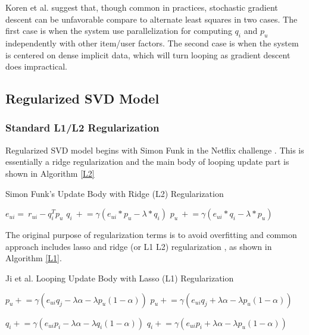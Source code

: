 \documentclass[letter paper, 11pt]{article}
\begin{document}
	Koren et al. \cite{MFinRS} suggest that, though common in practices, stochastic gradient descent can be unfavorable compare to alternate least squares in two cases. The first case is when the system use parallelization for computing $q_i$ and $p_u$ independently with other item/user factors. The second case is when the system is centered on dense implicit data, which will turn looping as gradient descent does impractical.

	

	\subsection{Regularized SVD Model}

	\subsubsection{Standard L1/L2 Regularization}

	\newcommand\myeq{\mathrel{\overset{\makebox[0pt]{\mbox{\normalfont\tiny\sffamily def}}}{=}}}
	\newcommand{\pluseq}{\mathrel{+}=}
	\newcommand{\minuseq}{\mathrel{-}=}
	Regularized SVD model begins with Simon Funk in the Netflix challenge \cite{MFinRS}. This is essentially a ridge regularization and the main body of looping update part is shown in Algorithm \ref{L2}
	\begin{algorithm}
		\caption{Simon Funk's Update Body with Ridge (L2) Regularization\cite{MFinRS}}
		\label{L2}
		\begin{algorithmic}
			\STATE $e_{ui} = \ r_{ui} - q_i^T p_u$
			\STATE $q_i\ \pluseq \gamma (e_{ui} * p_u - \lambda * q_i)$
			\STATE $p_u\ \pluseq \gamma (e_{ui} * q_i - \lambda * p_u)$
		\end{algorithmic}
	\end{algorithm}

	The original purpose of regularization terms is to avoid overfitting and common approach includes lasso and ridge (or L1 L2) regularization \cite{RSVD-News}, as shown in Algorithm \ref{L1}.
	
	\floatname{algorithm}{Algorithm}
	\begin{algorithm}
		\caption{Ji et al. Looping Update Body with Lasso (L1) Regularization\cite{RSVD-News}}
		\label{alg:L1}
		\begin{algorithmic}
			\IF{$p_u \geq 0$}
				\STATE $p_u \pluseq \gamma (e_{ui} q_j - \lambda \alpha - \lambda p_u ( 1 - \alpha))$
			\ELSE
				\STATE $p_u \pluseq \gamma (e_{ui} q_j + \lambda \alpha - \lambda p_u ( 1 - \alpha))$
			\ENDIF
			
			\IF{$q_i \geq 0$}
				\STATE $q_i \pluseq \gamma (e_{ui} p_i - \lambda \alpha - \lambda q_i ( 1 - \alpha))$
			\ELSE
				\STATE $q_i \pluseq \gamma (e_{ui} p_i + \lambda \alpha - \lambda p_u ( 1 - \alpha))$			
			\ENDIF
		\end{algorithmic}
	\end{algorithm}
\end{document}
